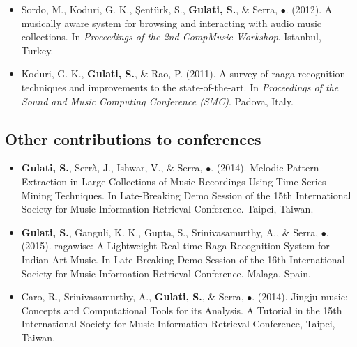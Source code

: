 \begin{itemize}[leftmargin=*]
	\item Sordo, M., Koduri, G. K., \c{S}ent{\"u}rk, S., \textbf{Gulati, S.}, \& Serra, $\bullet$. (2012). A musically aware system for browsing and interacting with audio music collections. In \textit{Proceedings of the 2nd CompMusic Workshop}. Istanbul, Turkey.
	\item Koduri, G. K., \textbf{Gulati, S.}, \& Rao, P. (2011). A survey of raaga recognition techniques and improvements to the state-of-the-art. In \textit{Proceedings of the Sound and Music Computing Conference (SMC)}. Padova, Italy.
\end{itemize}
%
\subsection*{Other contributions to conferences}
\begin{itemize}[leftmargin=*]
	\item \textbf{Gulati, S.},  Serr{\`a}, J., Ishwar, V., \& Serra, $\bullet$. (2014). Melodic Pattern Extraction in Large Collections of Music Recordings Using Time Series Mining Techniques. In Late-Breaking Demo Session of the 15th International Society for Music Information Retrieval Conference. Taipei, Taiwan. 
	\item \textbf{Gulati, S.}, Ganguli, K. K., Gupta, S., Srinivasamurthy, A., \& Serra, $\bullet$. (2015). \gls{ragawise}: A Lightweight Real-time Raga Recognition System for Indian Art Music. In Late-Breaking Demo Session of the 16th International Society for Music Information Retrieval Conference. Malaga, Spain. 
	\item Caro, R., Srinivasamurthy, A., \textbf{Gulati, S.}, \& Serra, $\bullet$. (2014). Jingju music: Concepts and Computational Tools for its Analysis. A Tutorial in the 15th International Society for Music Information Retrieval Conference, Taipei, Taiwan. 
	
\end{itemize}




